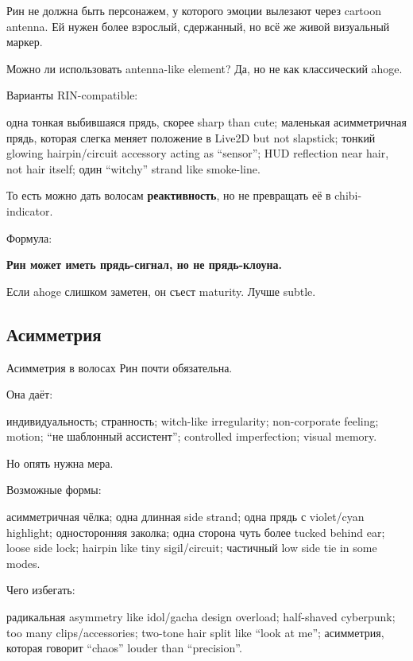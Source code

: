Рин не должна быть персонажем, у которого эмоции вылезают через cartoon
antenna. Ей нужен более взрослый, сдержанный, но всё же живой визуальный
маркер.

Можно ли использовать antenna-like element? Да, но не как классический
ahoge.

Варианты RIN-compatible:

одна тонкая выбившаяся прядь, скорее sharp than cute; маленькая
асимметричная прядь, которая слегка меняет положение в Live2D but not
slapstick; тонкий glowing hairpin/\hspace{0pt}circuit accessory acting as
``sensor''; HUD reflection near hair, not hair itself; один ``witchy''
strand like smoke-line.

То есть можно дать волосам \textbf{реактивность}, но не превращать её в
chibi-indicator.

Формула:

\textbf{Рин может иметь прядь-сигнал, но не прядь-клоуна.}

Если ahoge слишком заметен, он съест maturity. Лучше subtle.

\subsection*{Асимметрия}

Асимметрия в волосах Рин почти обязательна.

Она даёт:

индивидуальность; странность; witch-like irregularity; non-corporate
feeling; motion; ``не шаблонный ассистент''; controlled imperfection;
visual memory.

Но опять нужна мера.

Возможные формы:

асимметричная чёлка; одна длинная side strand; одна прядь с violet/\hspace{0pt}cyan
highlight; односторонняя заколка; одна сторона чуть более tucked behind
ear; loose side lock; hairpin like tiny sigil/\hspace{0pt}circuit; частичный low
side tie in some modes.

Чего избегать:

радикальная asymmetry like idol/\hspace{0pt}gacha design overload; half-shaved
cyberpunk; too many clips/\hspace{0pt}accessories; two-tone hair split like ``look
at me''; асимметрия, которая говорит ``chaos'' louder than
``precision''.

